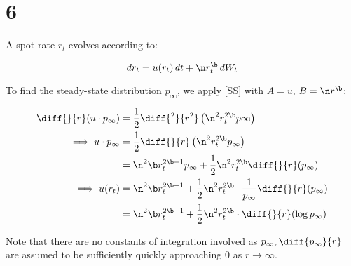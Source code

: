 \documentclass{article}
\begin{document}
	\section*{6}
	
	A spot rate $r_t$ evolves according to:
	
	\begin{equation*}
		dr_t = u(r_t) \, dt + \n r_t^\b \, dW_t
	\end{equation*}
	
	To find the steady-state distribution $p_\infty$, we apply \eqref{SS} with $A = u$, $B = \n r^\b$:
	
	\begin{align*}
		\diff{}{r}(u \cdot p_\infty) &= \frac{1}{2} \diff{^2}{r^2} \left(\n^2 r_t^{2\b}p\infty\right) \\
		\implies u \cdot p_\infty &= \frac{1}{2} \diff{}{r}\left(\n^2 r_t^{2\b}p_\infty\right) \\
		&= \n^2\b r_t^{2\b-1} p_\infty + \frac{1}{2}\n^2 r_t^{2\b}\diff{}{r}(p_\infty) \\
		\implies u(r_t) &= \n^2\b r_t^{2\b-1} + \frac{1}{2}\n^2 r_t^{2\b}\cdot \frac{1}{p_\infty}\diff{}{r}(p_\infty) \\
		&= \n^2\b r_t^{2\b-1} + \frac{1}{2}\n^2 r_t^{2\b}\cdot \diff{}{r}(\log p_\infty)
	\end{align*}
	
	Note that there are no constants of integration involved as $p_\infty, \diff{p_\infty}{r}$ are assumed to be sufficiently quickly approaching $0$ as $r \rightarrow \infty$.
\end{document}
